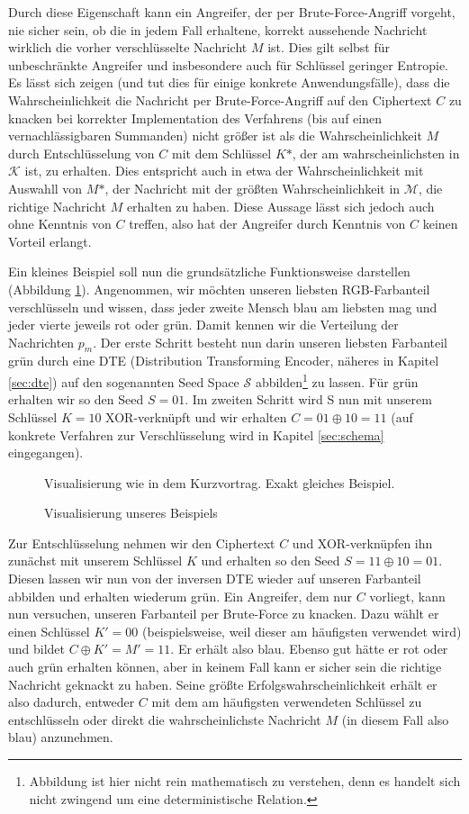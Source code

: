 Durch diese Eigenschaft kann ein Angreifer, der per Brute-Force-Angriff vorgeht, nie sicher sein, ob die in jedem Fall erhaltene, korrekt aussehende Nachricht wirklich die vorher verschlüsselte Nachricht \(M\) ist. Dies gilt selbst für unbeschränkte Angreifer und insbesondere auch für Schlüssel geringer Entropie. Es lässt sich zeigen (und \cite{EURO2014} tut dies für einige konkrete Anwendungsfälle), dass die Wahrscheinlichkeit die Nachricht per Brute-Force-Angriff auf den Ciphertext \(C\) zu knacken bei korrekter Implementation des Verfahrens (bis auf einen vernachlässigbaren Summanden) nicht größer ist als die Wahrscheinlichkeit \(M\) durch Entschlüsselung von \(C\) mit dem Schlüssel \(K\text{*}\), der am wahrscheinlichsten in \(\mathcal{K}\) ist, zu erhalten. Dies entspricht auch in etwa der Wahrscheinlichkeit mit Auswahll von \(M\text{*}\), der Nachricht mit der größten Wahrscheinlichkeit in \(\mathcal{M}\), die richtige Nachricht \(M\) erhalten zu haben. Diese Aussage lässt sich jedoch auch ohne Kenntnis von \(C\) treffen, also hat der Angreifer durch Kenntnis von \(C\) keinen Vorteil erlangt.

Ein kleines Beispiel soll nun die grundsätzliche Funktionsweise darstellen (Abbildung \ref{fig:Beispiel}). Angenommen, wir möchten unseren liebsten RGB-Farbanteil verschlüsseln und wissen, dass jeder zweite Mensch blau am liebsten mag und jeder vierte jeweils rot oder grün. Damit kennen wir die Verteilung der Nachrichten \(p_m\). Der erste Schritt besteht nun darin unseren liebsten Farbanteil grün durch eine DTE (Distribution Transforming Encoder, näheres in Kapitel \ref{sec:dte}) auf den sogenannten Seed Space \(\mathcal{S}\) abbilden\footnote{Abbildung ist hier nicht rein mathematisch zu verstehen, denn es handelt sich nicht zwingend um eine deterministische Relation.} zu lassen. Für grün erhalten wir so den Seed \(S=01\). Im zweiten Schritt wird S nun mit unserem Schlüssel \(K=10\) XOR-verknüpft und wir erhalten \(C=01 \oplus 10 = 11\) (auf konkrete Verfahren zur Verschlüsselung wird in Kapitel \ref{sec:schema} eingegangen). 

\begin{figure}[!h]
Visualisierung wie in dem Kurzvortrag. Exakt gleiches Beispiel.
\caption{Visualisierung unseres Beispiels}
\label{fig:Beispiel}
\end{figure}

Zur Entschlüsselung nehmen wir den Ciphertext \(C\) und XOR-verknüpfen ihn zunächst mit unserem Schlüssel \(K\) und erhalten so den Seed \(S = 11 \oplus 10 = 01\). Diesen lassen wir nun von der inversen DTE wieder auf unseren Farbanteil abbilden und erhalten wiederum grün. Ein Angreifer, dem nur \(C\) vorliegt, kann nun versuchen, unseren Farbanteil per Brute-Force zu knacken. Dazu wählt er einen Schlüssel \(K'=00\) (beispielsweise, weil dieser am häufigsten verwendet wird) und bildet \(C \oplus K' = M' = 11\). Er erhält also blau. Ebenso gut hätte er rot oder auch grün erhalten können, aber in keinem Fall kann er sicher sein die richtige Nachricht geknackt zu haben. Seine größte Erfolgswahrscheinlichkeit erhält er also dadurch, entweder \(C\) mit dem am häufigsten verwendeten Schlüssel zu entschlüsseln oder direkt die wahrscheinlichste Nachricht \(M\) (in diesem Fall also blau) anzunehmen.

